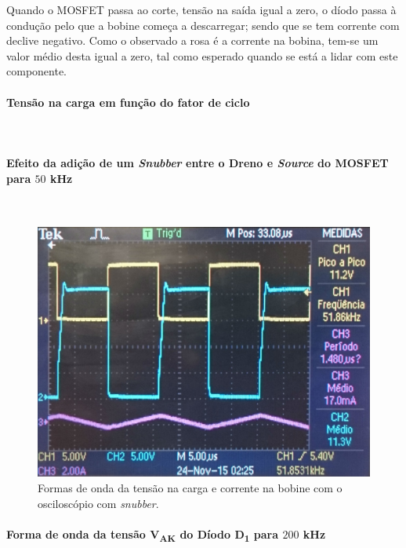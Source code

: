 \documentclass[a4paper,11pt]{article}
\numberwithin{equation}{section}
\begin{document}
Quando o MOSFET passa ao corte, tensão na saída igual a zero, o díodo passa à condução pelo que a bobine começa a descarregar; sendo que se tem corrente com declive negativo. Como o observado a rosa é a corrente na bobina, tem-se um valor médio desta igual a zero, tal como esperado quando se está a lidar com este componente. 

\paragraph{Tensão na carga em função do fator de ciclo}\mbox{}\

\paragraph{Efeito da adição de um \textit{Snubber} entre o Dreno e \textit{Source} do MOSFET para $50$ kHz}\mbox{}\

\begin{figure}[H]
	\centering
	\includegraphics[keepaspectratio=true, scale=0.175]{img/figs/snubber_buck}
	\caption{Formas de onda da tensão na carga e corrente na bobine com o osciloscópio com \textit{snubber}.}
	\label{fig:snubber_buck}
	\vspace{-0.8em}
\end{figure}



\paragraph{Forma de onda da tensão V\textsubscript{AK} do Díodo D\textsubscript{1} para $200$ kHz}\mbox{}\
\end{document}
